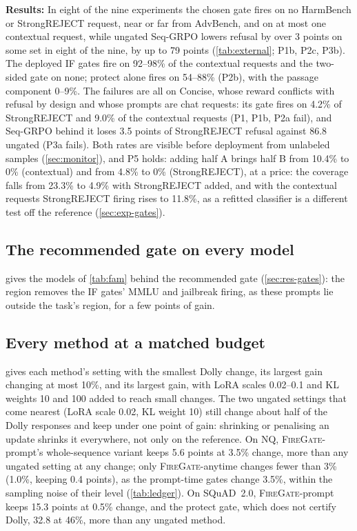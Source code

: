 \documentclass{article}
\theoremstyle{plain}
\theoremstyle{definition}
\theoremstyle{remark}
\newcommand{\methodp}{\textsc{FireGate}-prompt}
\newcommand{\methoda}{\textsc{FireGate}-anytime}
\newcommand{\resdir}{latex_v2_results}%
\newcommand{\placeholder}[1]{\begin{center}\fbox{\parbox[c][1.6cm][c]{0.9\linewidth}{\centering\small
  \textcolor{blue!60!black}{#1}}}\end{center}}
\newcommand{\inputor}[2]{\IfFileExists{#1}{}{\placeholder{#2}}}
\begin{document}
\textbf{Results:} In eight of the nine experiments the chosen gate fires on no HarmBench or StrongREJECT request, near
or far from AdvBench, and on at most one contextual request, while ungated Seq-GRPO lowers refusal by over 3 points
on some set in eight of the nine, by up to 79 points (\cref{tab:external}; P1b, P2c, P3b). The deployed IF gates fire
on 92--98\% of the contextual requests and the two-sided gate on none; protect alone fires on 54--88\% (P2b), with
the passage component 0--9\%. The failures are all on Concise, whose reward conflicts with refusal by design and whose
prompts are chat requests: its gate fires on 4.2\% of StrongREJECT and 9.0\% of the contextual requests (P1, P1b, P2a
fail), and Seq-GRPO behind it loses 3.5 points of StrongREJECT refusal against 86.8 ungated (P3a fails). Both rates
are visible before deployment from unlabeled samples (\cref{sec:monitor}), and P5 holds: adding half A brings half B
from 10.4\% to 0\% (contextual) and from 4.8\% to 0\% (StrongREJECT), at a price: the coverage falls from 23.3\% to
4.9\% with StrongREJECT added, and with the contextual requests StrongREJECT firing rises to 11.8\%, as a refitted
classifier is a different test off the reference (\cref{sec:exp-gates}).

\subsection{The recommended gate on every model}
\label{app:famrec}

 gives the models of \cref{tab:fam} behind the recommended gate (\cref{sec:res-gates}): the region
removes the IF gates' MMLU and jailbreak firing, as these prompts lie outside the task's region, for a few points of gain.

\inputor{\resdir/p3/famrec_table.tex}{Recommended gate table.}

\subsection{Every method at a matched budget}
\label{app:matched}

 gives each method's setting with the smallest Dolly change, its largest gain changing at most
10\%, and its largest gain, with LoRA scales 0.02--0.1 and KL weights 10 and 100 added to reach small changes. The two ungated settings that come nearest (LoRA scale 0.02, KL weight 10) still change about half of
the Dolly responses and keep under one point of gain: shrinking or penalising an update shrinks it everywhere, not
only on the reference. On NQ, \methodp{}'s whole-sequence variant keeps 5.6 points at
3.5\% change, more than any ungated setting at any change; only \methoda{} changes fewer than 3\% (1.0\%, keeping 0.4
points), as the prompt-time gates change 3.5\%, within the sampling noise of their level (\cref{tab:ledger}). On
SQuAD~2.0, \methodp{} keeps 15.3 points at 0.5\% change, and the protect gate, which does not certify Dolly, 32.8 at
46\%, more than any ungated method.
\end{document}

